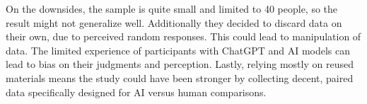 \documentclass[12pt]{article}
\begin{document}
On the downsides, the sample is quite small and limited to 40 people, so the result might not generalize well. Additionally they decided to discard data on their own, due to perceived random responses. This could lead to manipulation of data. The limited experience of participants with ChatGPT and AI models can lead to bias on their judgments and perception. Lastly, relying mostly on reused materials means the study could have been stronger by collecting decent, paired data specifically designed for AI versus human comparisons.







\end{document}
